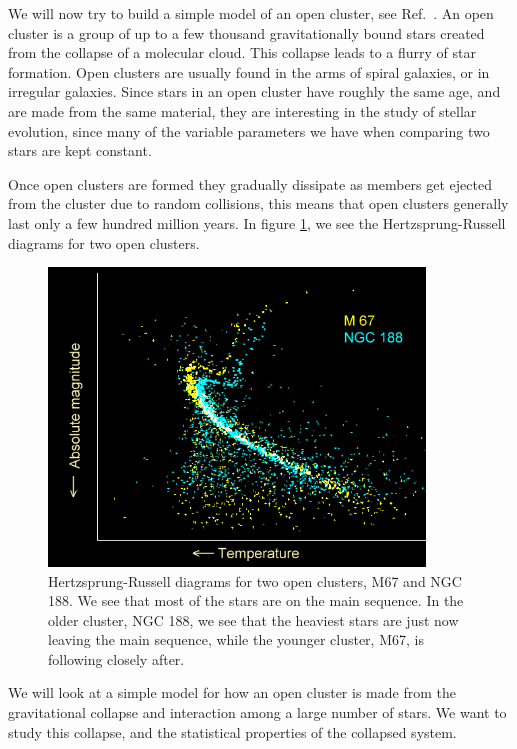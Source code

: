 \documentclass[11pt,a4wide]{article}
\begin{document}
We will now try to build a simple model of an open
cluster, see Ref.~\cite{openclusterref}. An
open cluster is a group of up to a few thousand gravitationally bound
stars created from the collapse of a molecular cloud. This collapse
leads to a flurry of star formation. Open clusters are usually found
in the arms of spiral galaxies, or in irregular galaxies. Since stars
in an open cluster have roughly the same age, and are made from the
same material, they are interesting in the study of stellar evolution,
since many of the variable parameters we have when comparing two stars
are kept constant.

Once open clusters are formed they gradually dissipate as members get
ejected from the cluster due to random collisions, this means that
open clusters generally last only a few hundred million years. In
figure \ref{HR}, we see the Hertzsprung-Russell diagrams for two open
clusters.

\begin{figure}[!h]
\centering
\includegraphics[width=10cm]{FigAstro/open_cluster_hr_diagram_ages.png}
\caption{Hertzsprung-Russell diagrams for two open clusters, M67 and
  NGC 188. We see that most of the stars are on the main sequence. In
  the older cluster, NGC 188, we see that the heaviest stars are just
  now leaving the main sequence, while the younger cluster, M67, is
  following closely after.}
\label{HR}
\end{figure}

We will look at a simple model for how an open cluster is made from
the gravitational collapse and interaction among a large number of
stars. We want to study this collapse, and the statistical properties
of the collapsed system.
\end{document}
